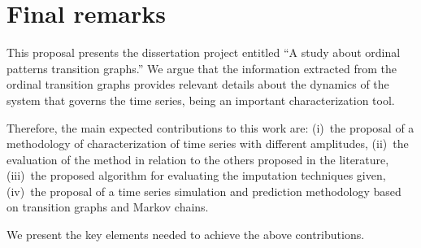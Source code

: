 \documentclass[paper=letter, fontsize=12pt]{article}
\begin{document}
\begin{table}[hbt]
\caption{Monthly agenda for 2020}\label{Tab:Schedule}
\label{tab:agenda}
\end{table}

\section{Final remarks}\label{sec:final}

This proposal presents the dissertation project entitled ``A study about ordinal patterns transition graphs.'' 
We argue that the information extracted from the ordinal transition graphs provides relevant details about the dynamics of the system that governs the time series, being an important characterization tool.

Therefore, the main expected contributions to this work are:
(i)~the proposal of a methodology of characterization of time series with different amplitudes,
(ii)~the evaluation of the method in relation to the others proposed in the literature, 
(iii)~the proposed algorithm for evaluating the imputation techniques given, 
(iv)~the proposal of a time series simulation and prediction methodology based on transition graphs and Markov chains.

We present the key elements needed to achieve the above contributions.

	


	
\end{document}
